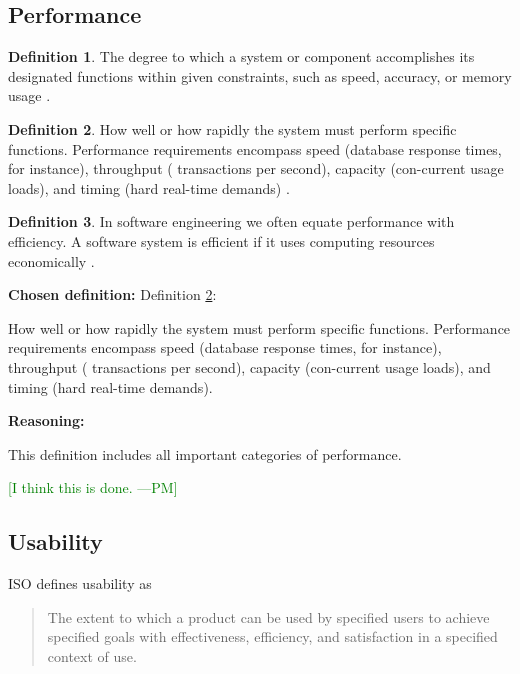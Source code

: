 \documentclass[letterpaper,cleveref]{lipics-v2019}
\newcommand{\authornote}[3]{\textcolor{#1}{[#3 ---#2]}}
\newcommand{\authornote}[3]{}
\newcommand{\pmi}[1]{\authornote{green}{PM}{#1}} %
\theoremstyle{definition}
\newtheorem{defn}{Definition}
\begin{document}
\subsection{Performance}
\begin{defn}
The degree to which a system or component accomplishes its designated functions within given constraints, such as speed, accuracy, or memory usage \citep{IEEEStdGlossarySET1990}.
\end{defn}
\begin{defn} \label{PerformanceDefnSelected}
How well or how rapidly the system must perform specific functions. Performance requirements encompass speed (database response times, for instance), throughput ( transactions per second), capacity (con-current usage loads), and timing (hard real-time demands) \citep{wiegers2003softreq}.
\end{defn}
\begin{defn}
In software engineering we often equate performance with efficiency. A software system is efficient if it uses computing resources economically \citep{ghezzi1991fundamentals}.
\end{defn}

\noindent \textbf{Chosen definition:} Definition \ref{PerformanceDefnSelected}:

How well or how rapidly the system must perform specific functions. Performance requirements encompass speed (database response times, for instance), throughput ( transactions per second), capacity (con-current usage loads), and timing (hard real-time demands).

\noindent \textbf{Reasoning:}

This definition includes all important categories of performance. 

\pmi{I think this is done.}

\subsection{Usability}

ISO defines usability as
\begin{quote}
The extent to which a product can be used by specified users to achieve
specified goals with effectiveness, efficiency, and satisfaction in a specified
context of use.
\end{quote}
\end{document}
